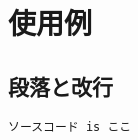 \chapter{使用例}
\label{chp:first}

\section{段落と改行}
\label{sec:paragraph}



\begin{lstlisting}[caption = キャプション, label = ラベル]
    ソースコード is ここ
 \end{lstlisting}


